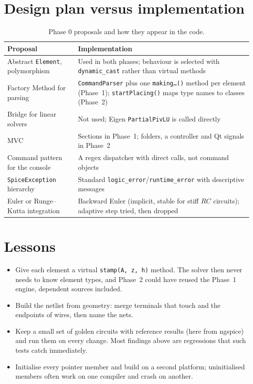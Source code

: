 \section{Design plan versus implementation}
\begin{table}[h]
\centering\small
\caption{Phase 0 proposals and how they appear in the code.}\label{tab:design}
\begin{tabularx}{\linewidth}{@{}l>{\raggedright\arraybackslash}X@{}}
\toprule
Proposal & Implementation \\
\midrule
Abstract \texttt{Element}, polymorphism & Used in both phases; behaviour is selected with \texttt{dynamic\_cast} rather than virtual methods \\
Factory Method for parsing & \texttt{CommandParser} plus one \texttt{making\dots()} method per element (Phase~1); \texttt{startPlacing()} maps type names to classes (Phase~2) \\
Bridge for linear solvers & Not used; Eigen \texttt{PartialPivLU} is called directly \\
MVC & Sections in Phase~1; folders, a controller and Qt signals in Phase~2 \\
Command pattern for the console & A regex dispatcher with direct calls, not command objects \\
\texttt{SpiceException} hierarchy & Standard \texttt{logic\_error}/\texttt{runtime\_error} with descriptive messages \\
Euler or Runge--Kutta integration & Backward Euler (implicit, stable for stiff $RC$ circuits); adaptive step tried, then dropped \\
\bottomrule
\end{tabularx}
\end{table}

\section{Lessons}
\begin{itemize}
  \item Give each element a virtual \texttt{stamp(A, z, h)} method. The solver then never needs to know element types, and
    Phase~2 could have reused the Phase~1 engine, dependent sources included.
  \item Build the netlist from geometry: merge terminals that touch and the endpoints of wires, then name the nets.
  \item Keep a small set of golden circuits with reference results (here from ngspice) and run them on every
    change. Most findings above are regressions that such tests catch immediately.
  \item Initialise every pointer member and build on a second platform; uninitialised members often work on one
    compiler and crash on another.
\end{itemize}

